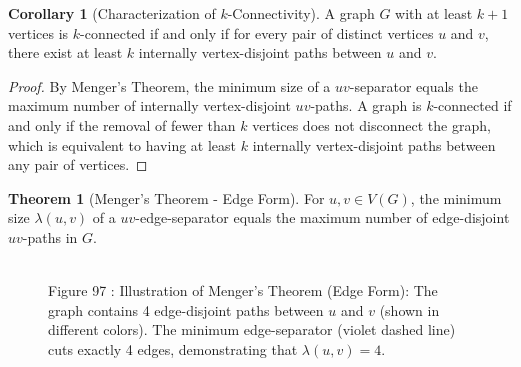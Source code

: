 \documentclass{article}
\theoremstyle{definition}
\newtheorem{theorem}{Theorem}
\newtheorem{corollary}{Corollary}
\begin{document}
\begin{corollary}[Characterization of $k$-Connectivity]
A graph $G$ with at least $k+1$ vertices is $k$-connected if and only if for every pair of distinct vertices $u$ and $v$, there exist at least $k$ internally vertex-disjoint paths between $u$ and $v$.
\end{corollary}

\begin{proof}
By Menger's Theorem, the minimum size of a $uv$-separator equals the maximum number of internally vertex-disjoint $uv$-paths. A graph is $k$-connected if and only if the removal of fewer than $k$ vertices does not disconnect the graph, which is equivalent to having at least $k$ internally vertex-disjoint paths between any pair of vertices.
\end{proof}

\begin{theorem}[Menger's Theorem - Edge Form]
For $u,v \in V(G)$, the minimum size $\lambda(u,v)$ of a $uv$-edge-separator equals the maximum number of edge-disjoint $uv$-paths in $G$.
\end{theorem}

\begin{figure}
\centering
{}
\\

\small Figure 97 : {Illustration of Menger's Theorem (Edge Form): The graph contains 4 edge-disjoint paths between $u$ and $v$ (shown in different colors). The minimum edge-separator (violet dashed line) cuts exactly 4 edges, demonstrating that $\lambda(u,v) = 4$.}
\label{fig:mengers-edge}
\end{figure}
\end{document}
